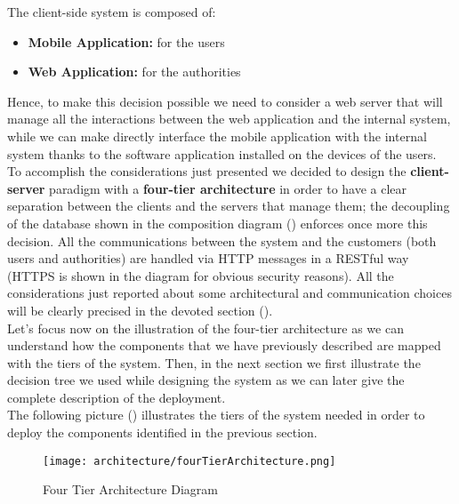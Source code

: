 		The client-side system is composed of:
		
		\begin{itemize}
			\item \textbf{Mobile Application:} for the users
			\item \textbf{Web Application:} for the authorities
		\end{itemize}
			
		Hence, to make this decision possible we need to consider a web server that will manage all the interactions between the web application and the internal system, while we can make directly interface the mobile application with the internal system thanks to the software application installed on the devices of the users.\\
		
		To accomplish the considerations just presented we decided to design the \textbf{client-server} paradigm with a \textbf{four-tier architecture} in order to have a clear separation between the clients and the servers that manage them; the decoupling of the database shown in the composition diagram () enforces once more this decision. All the communications between the system and the customers (both users and authorities) are handled via HTTP messages in a RESTful way (HTTPS is shown in the diagram for obvious security reasons). All the considerations just reported about some architectural and communication choices will be clearly precised in the devoted section ().\\
		
		Let's focus now on the illustration of the four-tier architecture as we can understand how the components that we have previously described are mapped with the tiers of the system. Then, in the next section we first illustrate the decision tree we used while designing the system as we can later give the complete description of the deployment.\\
		
		The following picture () illustrates the tiers of the system needed in order to deploy the components identified in the previous section. 
		
		\vspace{0.3cm}
		
		\begin{figure}[h!]
			\centering
			\texttt{[image: architecture/fourTierArchitecture.png]}
			\caption{\label{fig:fourTierArchitecture} Four Tier Architecture Diagram}
		\end{figure}
		
